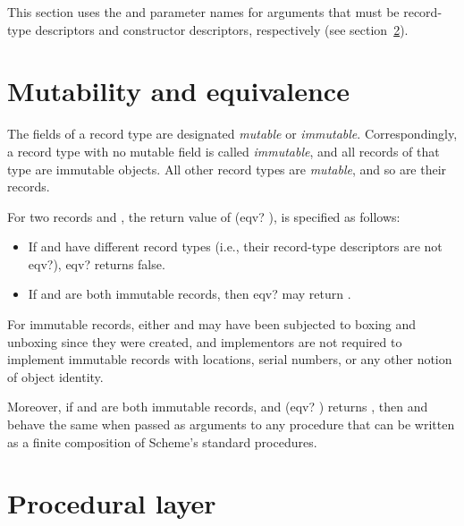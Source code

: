 This section uses the  and 
parameter names for arguments that must be record-type descriptors
and constructor descriptors, respectively (see
section~\ref{recordsproceduralsection}).

\section{Mutability and equivalence}
\label{recordsequivalencesection}
\label{recordsmutabilitysection}

The fields of a record type are designated \textit{mutable} or
\textit{immutable}.  Correspondingly, a record type with no mutable
field is called \textit{immutable}, and all records of that type
are immutable objects.  All other record types are \textit{mutable},
and so are their records.

For two records  and , the return value of {\cf
  (eqv?  )}, is specified as follows:

\begin{itemize}
\item If  and  have different record types (i.e.,
  their record-type descriptors are not {\cf eqv?}), {\cf eqv?}
  returns false.
\item If  and  are both immutable records, then
  {\cf eqv?} may return \schfalse.  
\end{itemize}

\begin{rationale}
  For immutable records, either  and  may have
  been subjected to boxing and unboxing since they were created, and
  implementors are not required to implement immutable records with
  locations, serial numbers, or any other notion of object identity.
\end{rationale}

Moreover, if  and  are both immutable records,
and {\cf (eqv?  )} returns \schtrue, then
 and  behave the same when passed as arguments to
any procedure that can be written as a finite composition of Scheme's
standard procedures.

\section{Procedural layer}
\label{recordsproceduralsection}

